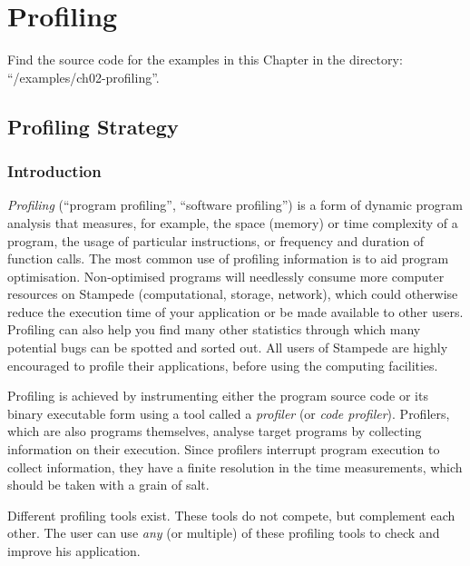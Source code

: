\chapter{Profiling}
\label{ch:ch02_profiling}

\renewcommand{\exampledir}{examples/ch02-profiling}

\begin{tip}
Find the source code for the examples in this Chapter in the directory:  ``\tilde/\exampledir''.
\end{tip}

\section{Profiling Strategy}
\label{sec:Profiling_Strategy}

\subsection{Introduction}
\label{subsec:Introduction}

\emph{Profiling} (``program profiling'', ``software profiling'') is a form of dynamic program analysis that measures, for example, the space (memory) or time complexity of a program, the usage of particular instructions, or frequency and duration of function calls. The most common use of profiling information is to aid program optimisation. Non-optimised programs will needlessly consume more computer resources on Stampede (computational, storage, network), which could otherwise reduce the execution time of your application or be made available to other users. Profiling can also help you find many other statistics through which many potential bugs can be spotted and sorted out. All users of Stampede are highly encouraged to profile their applications, before using the computing facilities.

Profiling is achieved by instrumenting either the program source code or its binary executable form using a tool called a \emph{profiler} (or \emph{code profiler}). Profilers, which are also programs themselves, analyse target programs by collecting information on their execution. Since profilers interrupt program execution to collect information, they have a finite resolution in the time measurements, which should be taken with a grain of salt.

Different profiling tools exist. These tools do not compete, but complement each other. The user can use \emph{any} (or multiple) of these profiling tools to check and improve his application.

